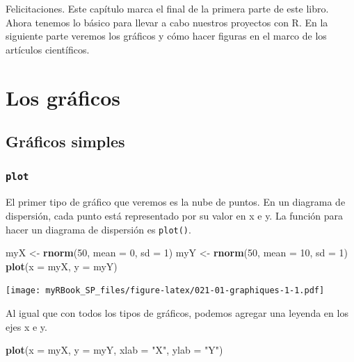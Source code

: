 \documentclass[
]{book}
\newenvironment{Shaded}{\begin{snugshade}}{\end{snugshade}}
\newcommand{\DataTypeTok}[1]{\textcolor[rgb]{0.13,0.29,0.53}{#1}}
\newcommand{\DecValTok}[1]{\textcolor[rgb]{0.00,0.00,0.81}{#1}}
\newcommand{\KeywordTok}[1]{\textcolor[rgb]{0.13,0.29,0.53}{\textbf{#1}}}
\newcommand{\NormalTok}[1]{#1}
\newcommand{\StringTok}[1]{\textcolor[rgb]{0.31,0.60,0.02}{#1}}
\begin{document}
Felicitaciones. Este capítulo marca el final de la primera parte de este libro. Ahora tenemos lo básico para llevar a cabo nuestros proyectos con R. En la siguiente parte veremos los gráficos y cómo hacer figuras en el marco de los artículos científicos.

\hypertarget{part-los-gruxe1ficos}{%
\part{Los gráficos}\label{part-los-gruxe1ficos}}

\hypertarget{graph1}{%
\chapter{Gráficos simples}\label{graph1}}

\hypertarget{graph1plot}{%
\section{\texorpdfstring{\texttt{plot}}{plot}}\label{graph1plot}}

El primer tipo de gráfico que veremos es la nube de puntos. En un diagrama de dispersión, cada punto está representado por su valor en x e y. La función para hacer un diagrama de dispersión es \texttt{plot()}.

\begin{Shaded}
\begin{Highlighting}[]
\NormalTok{myX <-}\StringTok{ }\KeywordTok{rnorm}\NormalTok{(}\DecValTok{50}\NormalTok{, }\DataTypeTok{mean =} \DecValTok{0}\NormalTok{, }\DataTypeTok{sd =} \DecValTok{1}\NormalTok{)}
\NormalTok{myY <-}\StringTok{ }\KeywordTok{rnorm}\NormalTok{(}\DecValTok{50}\NormalTok{, }\DataTypeTok{mean =} \DecValTok{10}\NormalTok{, }\DataTypeTok{sd =} \DecValTok{1}\NormalTok{)}
\KeywordTok{plot}\NormalTok{(}\DataTypeTok{x =}\NormalTok{ myX, }\DataTypeTok{y =}\NormalTok{ myY)}
\end{Highlighting}
\end{Shaded}

\texttt{[image: myRBook\_SP\_files/figure-latex/021-01-graphiques-1-1.pdf]}

Al igual que con todos los tipos de gráficos, podemos agregar una leyenda en los ejes x e y.

\begin{Shaded}
\begin{Highlighting}[]
\KeywordTok{plot}\NormalTok{(}\DataTypeTok{x =}\NormalTok{ myX, }\DataTypeTok{y =}\NormalTok{ myY, }
  \DataTypeTok{xlab =} \StringTok{"X"}\NormalTok{, }\DataTypeTok{ylab =} \StringTok{"Y"}\NormalTok{)}
\end{Highlighting}
\end{Shaded}
\end{document}
